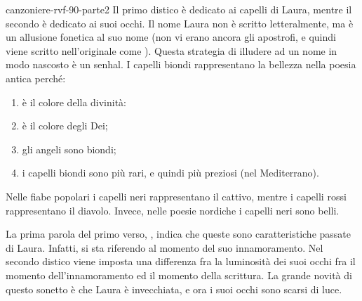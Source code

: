 \documentclass[preview]{standalone}
\begin{document}
\begin{snippet}{canzoniere-rvf-90-parte2}
     Il primo distico è dedicato ai capelli di Laura, mentre il secondo è
    dedicato ai suoi occhi. Il nome Laura non è scritto letteralmente,
    ma  è un allusione fonetica al suo nome (non vi erano ancora gli apostrofi,
    e quindi viene scritto nell'originale come ).
    Questa strategia di illudere ad un nome in modo nascosto è un senhal.
    I capelli biondi rappresentano la bellezza nella poesia antica perché:

    \begin{enumerate}
        \item è il colore della divinità:
        \item è il colore degli Dei;
        \item gli angeli sono biondi;
        \item i capelli biondi sono più rari, e quindi più preziosi (nel Mediterrano).
    \end{enumerate}
    Nelle fiabe popolari i capelli neri rappresentano il cattivo,
    mentre i capelli rossi rappresentano il diavolo.
    Invece, nelle poesie nordiche i capelli neri sono belli.

    La prima parola del primo verso, , indica che queste sono caratteristiche
    passate di Laura. Infatti, si sta riferendo al momento del suo innamoramento.
    Nel secondo distico viene imposta una differenza fra la luminosità dei suoi occhi
    fra il momento dell'innamoramento ed il momento della scrittura.
    La grande novità di questo sonetto è che Laura è invecchiata, e ora i suoi occhi sono scarsi di luce.
    \\\\


\end{snippet}
\end{document}
